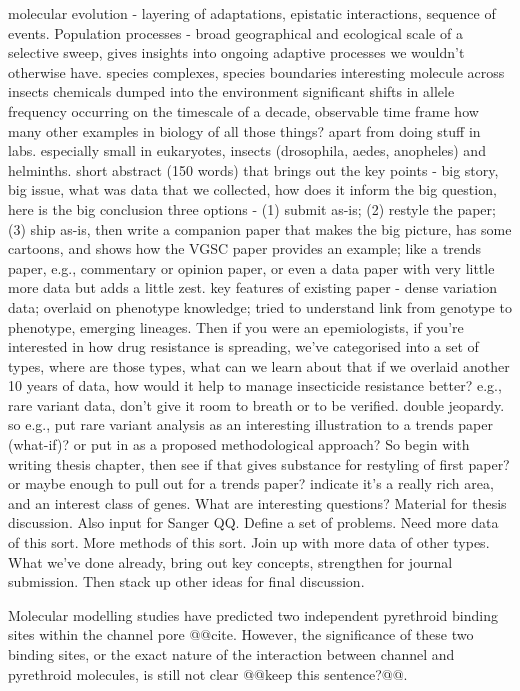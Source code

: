 \documentclass[a4paper,11pt,abstracton,hidelinks]{scrartcl}
\begin{document}
molecular evolution - layering of adaptations, epistatic interactions, sequence of events.
%
Population processes - broad geographical and ecological scale of a selective sweep, gives insights into ongoing adaptive processes we wouldn't otherwise have.
%
species complexes, species boundaries
%
interesting molecule across insects
%
chemicals dumped into the environment
%
significant shifts in allele frequency occurring on the timescale of a decade, observable time frame
%
how many other examples in biology of all those things? apart from doing stuff in labs.
%
especially small in eukaryotes, insects (drosophila, aedes, anopheles) and helminths.
%
short abstract (150 words) that brings out the key points - big story, big issue, what was data that we collected, how does it inform the big question, here is the big conclusion
%
three options - (1) submit as-is; (2) restyle the paper; (3) ship as-is, then write a companion paper that makes the big picture, has some cartoons, and shows how the VGSC paper provides an example; like a trends paper, e.g., commentary or opinion paper, or even a data paper with very little more data but adds a little zest.
%
key features of existing paper - dense variation data; overlaid on phenotype knowledge; tried to understand link from genotype to phenotype, emerging lineages. Then if you were an epemiologists, if you're interested in how drug resistance is spreading, we've categorised into a set of types, where are those types, what can we learn about that if we overlaid another 10 years of data, how would it help to manage insecticide resistance better?
%
e.g., rare variant data, don't give it room to breath or to be verified. double jeopardy. so e.g., put rare variant analysis as an interesting illustration to a trends paper (what-if)? or put in as a proposed methodological approach?
%
So begin with writing thesis chapter, then see if that gives substance for restyling of first paper? or maybe enough to pull out for a trends paper? indicate it's a really rich area, and an interest class of genes.
%
What are interesting questions? Material for thesis discussion. Also input for Sanger QQ. Define a set of problems. Need more data of this sort. More methods of this sort. Join up with more data of other types.
%
What we've done already, bring out key concepts, strengthen for journal submission. Then stack up other ideas for final discussion.


Molecular modelling studies have predicted two independent pyrethroid binding sites within the channel pore @@cite.
%
However, the significance of these two binding sites, or the exact nature of the interaction between channel and pyrethroid molecules, is still not clear @@keep this sentence?@@.
\end{document}
